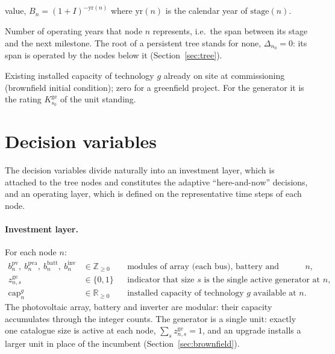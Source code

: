 \documentclass[11pt,a4paper]{article}
\theoremstyle{plain}
\theoremstyle{definition}
\newcommand{\Rpos}{\mathbb{R}_{\geq 0}}
\newcommand{\Zpos}{\mathbb{Z}_{\geq 0}}
\begin{document}
\begin{description}[leftmargin=3.0cm,style=nextline]
  value, $B_n=(1+I)^{-\mathrm{yr}(n)}$ where $\mathrm{yr}(n)$ is the calendar year of
  $\mathrm{stage}(n)$.
  \item[$\Delta_n$] Number of operating years that node $n$ represents, i.e.\ the span
  between its stage and the next milestone. The root of a persistent tree stands for none,
  $\Delta_{n_0}=0$: its span is operated by the nodes below it (Section~\ref{sec:tree}).
  \item[$C^{g}_0$] Existing installed capacity of technology $g$ already on site at
  commissioning (brownfield initial condition); zero for a greenfield project. For the
  generator it is the rating $K^{\mathrm{ge}}_{s_0}$ of the unit standing.
\end{description}

\section{Decision variables}
\label{sec:variables}

The decision variables divide naturally into an investment layer, which is attached to
the tree nodes and constitutes the adaptive ``here-and-now'' decisions, and an operating
layer, which is defined on the representative time steps of each node.

\paragraph{Investment layer.} For each node $n$:
\begin{align}
  b^{\mathrm{pv}}_n,\ b^{\mathrm{pva}}_n,\ b^{\mathrm{batt}}_n,\ b^{\mathrm{inv}}_n
    &\in \Zpos
    && \text{modules of array (each bus), battery and inverter added at $n$,}\\
  z^{\mathrm{ge}}_{n,s} &\in \{0,1\}
    && \text{indicator that size $s$ is the single active generator at $n$,}\\
  \mathrm{cap}^{g}_n &\in \Rpos
    && \text{installed capacity of technology $g$ available at $n$.}
\end{align}
The photovoltaic array, battery and inverter are modular: their capacity accumulates
through the integer counts. The generator is a single unit: exactly one catalogue size is
active at each node, $\sum_{s}z^{\mathrm{ge}}_{n,s}=1$, and an upgrade installs a larger
unit in place of the incumbent (Section~\ref{sec:brownfield}).
\end{document}
